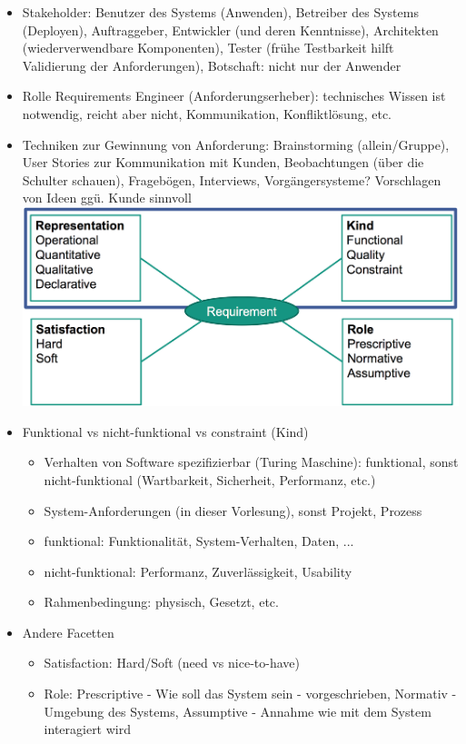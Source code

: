 \documentclass[paper=a4, fontsize=11pt]{scrartcl} %
\numberwithin{equation}{section} %
\numberwithin{figure}{section} %
\numberwithin{table}{section} %
\begin{document}
\begin{itemize}
  \item Stakeholder: Benutzer des Systems (Anwenden), Betreiber des Systems (Deployen), Auftraggeber, Entwickler (und deren Kenntnisse), Architekten (wiederverwendbare Komponenten), Tester (frühe Testbarkeit hilft Validierung der Anforderungen), Botschaft: nicht nur der Anwender
  \item Rolle Requirements Engineer (Anforderungserheber): technisches Wissen ist notwendig, reicht aber nicht, Kommunikation, Konfliktlösung, etc.
  \item Techniken zur Gewinnung von Anforderung: Brainstorming (allein/Gruppe), User Stories zur Kommunikation mit Kunden, Beobachtungen (über die Schulter schauen), Fragebögen, Interviews, Vorgängersysteme? Vorschlagen von Ideen ggü. Kunde sinnvoll\\
  \includegraphics[width=\linewidth]{imgs/requirements_types}
  \item Funktional vs nicht-funktional vs constraint (Kind)
  \begin{itemize}
    \item Verhalten von Software spezifizierbar (Turing Maschine): funktional, sonst nicht-funktional (Wartbarkeit, Sicherheit, Performanz, etc.)
    \item System-Anforderungen (in dieser Vorlesung), sonst Projekt, Prozess
    \item funktional: Funktionalität, System-Verhalten, Daten, ...
    \item nicht-funktional: Performanz, Zuverlässigkeit, Usability
    \item Rahmenbedingung: physisch, Gesetzt, etc.
  \end{itemize}
  \item Andere Facetten
  \begin{itemize}
    \item Satisfaction: Hard/Soft (need vs nice-to-have)
    \item Role: Prescriptive - Wie soll das System sein - vorgeschrieben, Normativ - Umgebung des Systems, Assumptive - Annahme wie mit dem System interagiert wird

\end{itemize}
\end{itemize}
\end{document}

